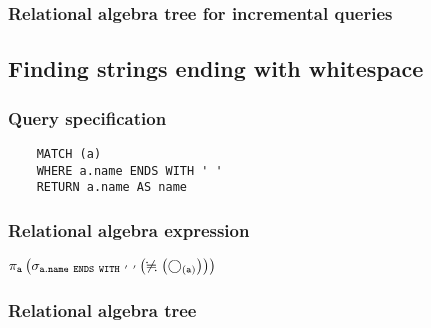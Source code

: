 	\subsubsection*{Relational algebra tree for incremental queries}

	\subsection{Finding strings ending with whitespace}

	\subsubsection*{Query specification}

	\begin{lstlisting}
	MATCH (a)
	WHERE a.name ENDS WITH ' '
	RETURN a.name AS name
	\end{lstlisting}


	\subsubsection*{Relational algebra expression}

	$\projection{\var{a}} \left(\selection{\mathtt{a.name~ENDS~WITH~'~'}} \left(\alldifferent{} \left(\getvertices{a}{}\right)\right)\right)$

	\subsubsection*{Relational algebra tree}


